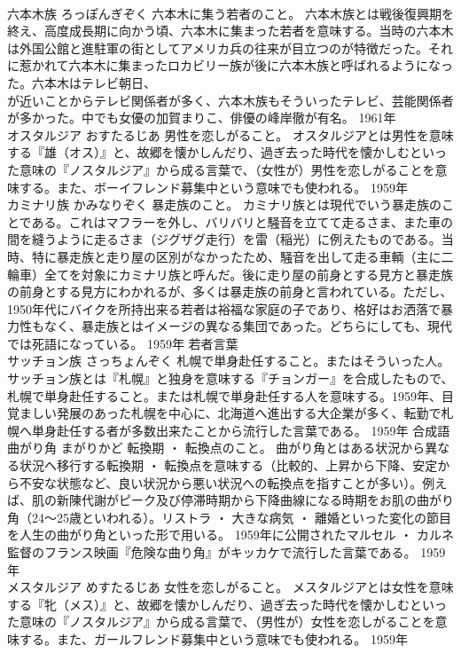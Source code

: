 \documentclass[8pt]{extreport}
\begin{document}
\begin{CJK}{UTF8}{min}
\\	六本木族	ろっぽんぎぞく	六本木に集う若者のこと。	六本木族とは戦後復興期を終え、高度成長期に向かう頃、六本木に集まった若者を意味する。当時の六本木は外国公館と進駐軍の街としてアメリカ兵の往来が目立つのが特徴だった。それに惹かれて六本木に集まったロカビリー族が後に六本木族と呼ばれるようになった。六本木はテレビ朝日、
\\	が近いことからテレビ関係者が多く、六本木族もそういったテレビ、芸能関係者が多かった。中でも女優の加賀まりこ、俳優の峰岸徹が有名。	1961年	
\\	オスタルジア	おすたるじあ	男性を恋しがること。	オスタルジアとは男性を意味する『雄（オス）』と、故郷を懐かしんだり、過ぎ去った時代を懐かしむといった意味の『ノスタルジア』から成る言葉で、（女性が）男性を恋しがることを意味する。また、ボーイフレンド募集中という意味でも使われる。	1959年	
\\	カミナリ族	かみなりぞく	暴走族のこと。	カミナリ族とは現代でいう暴走族のことである。これはマフラーを外し、バリバリと騒音を立てて走るさま、また車の間を縫うように走るさま（ジグザグ走行）を雷（稲光）に例えたものである。当時、特に暴走族と走り屋の区別がなかったため、騒音を出して走る車輌（主に二輪車）全てを対象にカミナリ族と呼んだ。後に走り屋の前身とする見方と暴走族の前身とする見方にわかれるが、多くは暴走族の前身と言われている。ただし、1950年代にバイクを所持出来る若者は裕福な家庭の子であり、格好はお洒落で暴力性もなく、暴走族とはイメージの異なる集団であった。どちらにしても、現代では死語になっている。	1959年	若者言葉	
\\	サッチョン族	さっちょんぞく	札幌で単身赴任すること。またはそういった人。	サッチョン族とは『札幌』と独身を意味する『チョンガー』を合成したもので、札幌で単身赴任すること。または札幌で単身赴任する人を意味する。1959年、目覚ましい発展のあった札幌を中心に、北海道へ進出する大企業が多く、転勤で札幌へ単身赴任する者が多数出来たことから流行した言葉である。	1959年	合成語	
\\	曲がり角	まがりかど	転換期 ・ 転換点のこと。	曲がり角とはある状況から異なる状況へ移行する転換期 ・ 転換点を意味する（比較的、上昇から下降、安定から不安な状態など、良い状況から悪い状況への転換点を指すことが多い）。例えば、肌の新陳代謝がピーク及び停滞時期から下降曲線になる時期をお肌の曲がり角（24～25歳といわれる）。リストラ ・ 大きな病気 ・ 離婚といった変化の節目を人生の曲がり角といった形で用いる。 1959年に公開されたマルセル ・ カルネ監督のフランス映画『危険な曲り角』がキッカケで流行した言葉である。	1959年	
\\	メスタルジア	めすたるじあ	女性を恋しがること。	メスタルジアとは女性を意味する『牝（メス）』と、故郷を懐かしんだり、過ぎ去った時代を懐かしむといった意味の『ノスタルジア』から成る言葉で、（男性が）女性を恋しがることを意味する。また、ガールフレンド募集中という意味でも使われる。	1959年	

\end{CJK}
\end{document}
